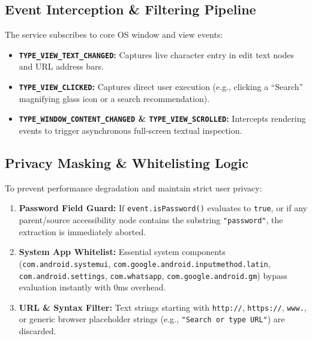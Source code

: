 \documentclass[11pt,a4paper]{article}
\begin{document}
\subsection{Event Interception \& Filtering Pipeline}
The service subscribes to core OS window and view events:
\begin{itemize}[leftmargin=1.5cm]
    \item \textbf{\texttt{TYPE\_VIEW\_TEXT\_CHANGED}:} Captures live character entry in edit text nodes and URL address bars.
    \item \textbf{\texttt{TYPE\_VIEW\_CLICKED}:} Captures direct user execution (e.g., clicking a ``Search'' magnifying glass icon or a search recommendation).
    \item \textbf{\texttt{TYPE\_WINDOW\_CONTENT\_CHANGED} \& \texttt{TYPE\_VIEW\_SCROLLED}:} Intercepts rendering events to trigger asynchronous full-screen textual inspection.
\end{itemize}

\subsection{Privacy Masking \& Whitelisting Logic}
To prevent performance degradation and maintain strict user privacy:
\begin{enumerate}
    \item \textbf{Password Field Guard:} If \texttt{event.isPassword()} evaluates to \texttt{true}, or if any parent/source accessibility node contains the substring \texttt{"password"}, the extraction is immediately aborted.
    \item \textbf{System App Whitelist:} Essential system components (\texttt{com.android.systemui}, \texttt{com.google.android.inputmethod.latin}, \texttt{com.android.settings}, \texttt{com.whatsapp}, \texttt{com.google.android.gm}) bypass evaluation instantly with 0ms overhead.
    \item \textbf{URL \& Syntax Filter:} Text strings starting with \texttt{http://}, \texttt{https://}, \texttt{www.}, or generic browser placeholder strings (e.g., \texttt{"Search or type URL"}) are discarded.
\end{enumerate}
\end{document}
